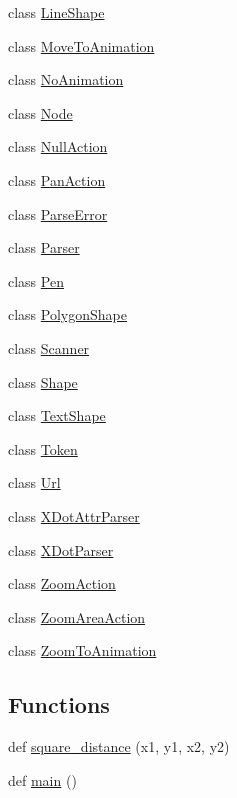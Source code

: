 \begin{DoxyCompactItemize}
\item 
class \hyperlink{classsmacc__viewer_1_1xdot_1_1xdot_1_1LineShape}{Line\+Shape}
\item 
class \hyperlink{classsmacc__viewer_1_1xdot_1_1xdot_1_1MoveToAnimation}{Move\+To\+Animation}
\item 
class \hyperlink{classsmacc__viewer_1_1xdot_1_1xdot_1_1NoAnimation}{No\+Animation}
\item 
class \hyperlink{classsmacc__viewer_1_1xdot_1_1xdot_1_1Node}{Node}
\item 
class \hyperlink{classsmacc__viewer_1_1xdot_1_1xdot_1_1NullAction}{Null\+Action}
\item 
class \hyperlink{classsmacc__viewer_1_1xdot_1_1xdot_1_1PanAction}{Pan\+Action}
\item 
class \hyperlink{classsmacc__viewer_1_1xdot_1_1xdot_1_1ParseError}{Parse\+Error}
\item 
class \hyperlink{classsmacc__viewer_1_1xdot_1_1xdot_1_1Parser}{Parser}
\item 
class \hyperlink{classsmacc__viewer_1_1xdot_1_1xdot_1_1Pen}{Pen}
\item 
class \hyperlink{classsmacc__viewer_1_1xdot_1_1xdot_1_1PolygonShape}{Polygon\+Shape}
\item 
class \hyperlink{classsmacc__viewer_1_1xdot_1_1xdot_1_1Scanner}{Scanner}
\item 
class \hyperlink{classsmacc__viewer_1_1xdot_1_1xdot_1_1Shape}{Shape}
\item 
class \hyperlink{classsmacc__viewer_1_1xdot_1_1xdot_1_1TextShape}{Text\+Shape}
\item 
class \hyperlink{classsmacc__viewer_1_1xdot_1_1xdot_1_1Token}{Token}
\item 
class \hyperlink{classsmacc__viewer_1_1xdot_1_1xdot_1_1Url}{Url}
\item 
class \hyperlink{classsmacc__viewer_1_1xdot_1_1xdot_1_1XDotAttrParser}{X\+Dot\+Attr\+Parser}
\item 
class \hyperlink{classsmacc__viewer_1_1xdot_1_1xdot_1_1XDotParser}{X\+Dot\+Parser}
\item 
class \hyperlink{classsmacc__viewer_1_1xdot_1_1xdot_1_1ZoomAction}{Zoom\+Action}
\item 
class \hyperlink{classsmacc__viewer_1_1xdot_1_1xdot_1_1ZoomAreaAction}{Zoom\+Area\+Action}
\item 
class \hyperlink{classsmacc__viewer_1_1xdot_1_1xdot_1_1ZoomToAnimation}{Zoom\+To\+Animation}
\end{DoxyCompactItemize}
\subsection*{Functions}
\begin{DoxyCompactItemize}
\item 
def \hyperlink{namespacesmacc__viewer_1_1xdot_1_1xdot_abad117a3bd6d23954bbe1b261b595bfd}{square\+\_\+distance} (x1, y1, x2, y2)
\item 
def \hyperlink{namespacesmacc__viewer_1_1xdot_1_1xdot_a1d6f97e5f27b256b6d6aa937f3d5d2fc}{main} ()
\end{DoxyCompactItemize}
